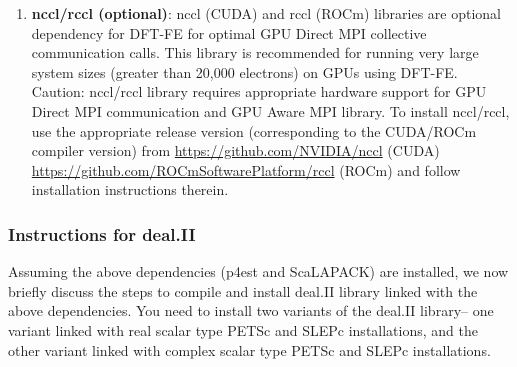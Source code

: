\begin{enumerate}

\item {\bf nccl/rccl (optional)}: nccl (CUDA) and rccl (ROCm) libraries are optional dependency for DFT-FE for optimal GPU Direct MPI collective communication calls. This library is recommended for running very large system sizes (greater than 20,000 electrons) on GPUs using DFT-FE. Caution: nccl/rccl library requires appropriate hardware support for GPU Direct MPI communication and GPU Aware MPI library. To install nccl/rccl, use the appropriate release version (corresponding to the CUDA/ROCm compiler version) from \url{https://github.com/NVIDIA/nccl} (CUDA) \url{https://github.com/ROCmSoftwarePlatform/rccl} (ROCm) and follow installation instructions therein.

\end{enumerate}


\subsubsection{Instructions for deal.II}
Assuming the above dependencies (p4est and ScaLAPACK) are installed, we now briefly discuss the steps to compile and install deal.II library linked with the above dependencies. You need to install two variants of the deal.II library-- one variant linked with real scalar type PETSc and SLEPc installations, and the other variant linked with complex scalar type PETSc and SLEPc installations. 

